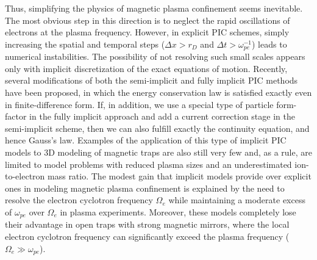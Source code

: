 \documentclass[final,3p]{elsarticle}
\begin{document}
Thus, simplifying the physics of magnetic plasma confinement seems inevitable. The most obvious step in this direction is to neglect the rapid oscillations of electrons at the plasma frequency. However, in explicit PIC schemes, simply increasing the spatial and temporal steps ($\Delta x>r_D$ and $\Delta t>\omega_{pe}^{-1}$) leads to numerical instabilities. The possibility of not resolving such small scales appears only with implicit discretization of the exact equations of motion. Recently, several modifications of both the semi-implicit \cite{Lapenta2017,Lapenta2023} and fully implicit \cite{Markidis2011,Chen2011,Chen2014,Chen2023,Angus2023} PIC methods have been proposed, in which the energy conservation law is satisfied exactly even in finite-difference form. If, in addition, we use a special type of particle form-factor \cite{Chen2011,Chen2023} in the fully implicit approach and add a current correction stage \cite{Berendeev2024,Berendeev2024a} in the semi-implicit scheme, then we can also fulfill exactly the continuity equation, and hence Gauss's law. Examples of the application of this type of implicit PIC models to 3D modeling of magnetic traps are also still very few \cite{Ren2024,Park2026,Berendeev2026} and, as a rule, are limited to model problems with reduced plasma sizes and an underestimated ion-to-electron mass ratio. The modest gain that implicit models provide over explicit ones in modeling magnetic plasma confinement is explained by the need to resolve the electron cyclotron frequency $\Omega_e$ while maintaining a moderate excess of $\omega_{pe}$ over $\Omega_e$ in plasma experiments. Moreover, these models completely lose their advantage in open traps with strong magnetic mirrors, where the local electron cyclotron frequency can significantly exceed the plasma frequency ($\Omega_e\gg\omega_{pe}$).
\end{document}
